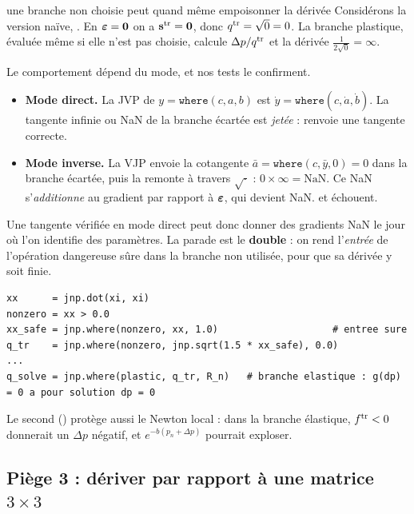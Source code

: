 \begin{piege}{une branche non choisie peut quand même empoisonner la dérivée}
Considérons la version naïve, . En $\boldsymbol{\varepsilon}=\mathbf{0}$ on a $\mathbf{s}^{\mathrm{tr}}=\mathbf{0}$, donc $q^{\mathrm{tr}}=\sqrt0=0$. La branche plastique, évaluée même si elle n'est pas choisie, calcule $\Delta p/q^{\mathrm{tr}}$ et la dérivée $\frac{1}{2\sqrt{0}}=\infty$.
\end{piege}

Le comportement dépend du mode, et nos tests le confirment.
\begin{itemize}[nosep]
  \item \textbf{Mode direct.} La JVP de $y=\mathtt{where}(c,a,b)$ est $\dot y=\mathtt{where}(c,\dot a,\dot b)$. La tangente infinie ou NaN de la branche écartée est \emph{jetée} :  renvoie une tangente correcte.
  \item \textbf{Mode inverse.} La VJP envoie la cotangente $\bar a=\mathtt{where}(c,\bar y,0)=0$ dans la branche écartée, puis la remonte à travers $\sqrt{\cdot}$ : $0\times\infty=\mathrm{NaN}$. Ce NaN s'\emph{additionne} au gradient par rapport à $\boldsymbol{\varepsilon}$, qui devient NaN.  et  échouent.
\end{itemize}
Une tangente vérifiée en mode direct peut donc donner des gradients NaN le jour où l'on identifie des paramètres. La parade est le \textbf{double } : on rend l'\emph{entrée} de l'opération dangereuse sûre dans la branche non utilisée, pour que sa dérivée y soit finie.
\begin{lstlisting}
xx      = jnp.dot(xi, xi)
nonzero = xx > 0.0
xx_safe = jnp.where(nonzero, xx, 1.0)                    # entree sure
q_tr    = jnp.where(nonzero, jnp.sqrt(1.5 * xx_safe), 0.0)
...
q_solve = jnp.where(plastic, q_tr, R_n)   # branche elastique : g(dp) = 0 a pour solution dp = 0
\end{lstlisting}
Le second  () protège aussi le Newton local : dans la branche élastique, $f^{\mathrm{tr}}<0$ donnerait un $\Delta p$ négatif, et $e^{-b(p_n+\Delta p)}$ pourrait exploser.

\subsection{Piège 3 : dériver par rapport à une matrice \texorpdfstring{$3\times3$}{3x3}}

